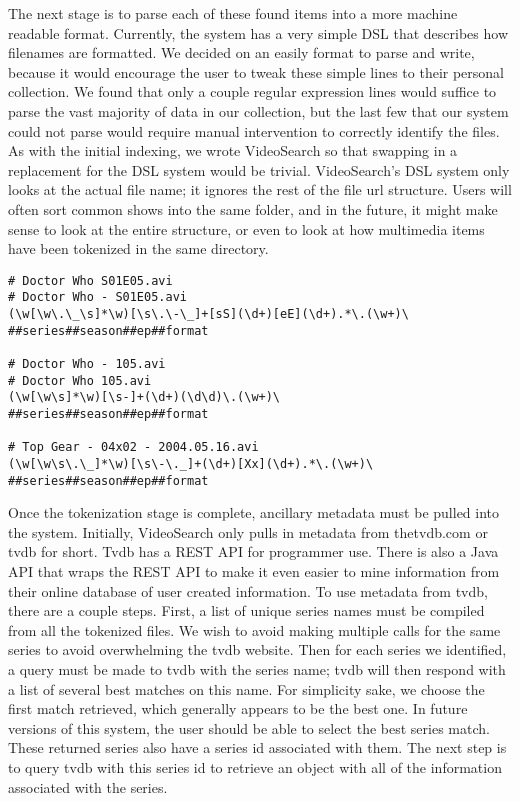\documentclass{acm_proc_article-sp}
\begin{document}
The next stage is to parse each of these found items into a more machine readable format.  Currently, the system has a very simple DSL that describes how filenames are formatted.  We decided on an easily format to parse and write, because it would encourage the user to tweak these simple lines to their personal collection.  \cite{wall2000programming} We found that only a couple regular expression lines would suffice to parse the vast majority of data in our collection, but the last few that our system could not parse would require manual intervention to correctly identify the files.  As with the initial indexing, we wrote VideoSearch so that swapping in a replacement for the DSL system would be trivial.  VideoSearch\textquoteright s DSL system only looks at the actual file name; it ignores the rest of the file url structure.  Users will often sort common shows into the same folder, and in the future, it might make sense to look at the entire structure, or even to look at how multimedia items have been tokenized in the same directory.
\begin{verbatim}
# Doctor Who S01E05.avi
# Doctor Who - S01E05.avi
(\w[\w\.\_\s]*\w)[\s\.\-\_]+[sS](\d+)[eE](\d+).*\.(\w+)\
##series##season##ep##format

# Doctor Who - 105.avi
# Doctor Who 105.avi
(\w[\w\s]*\w)[\s-]+(\d+)(\d\d)\.(\w+)\
##series##season##ep##format

# Top Gear - 04x02 - 2004.05.16.avi
(\w[\w\s\.\_]*\w)[\s\-\._]+(\d+)[Xx](\d+).*\.(\w+)\
##series##season##ep##format
\end{verbatim}
Once the tokenization stage is complete, ancillary metadata must be pulled into the system.  Initially, VideoSearch only pulls in metadata from thetvdb.com or tvdb for short.  Tvdb has a REST API for programmer use. \cite{tvdb} There is also a Java API that wraps the REST API to make it even easier to mine information from their online database of user created information.  To use metadata from tvdb, there are a couple steps.  First, a list of unique series names must be compiled from all the tokenized files.  We wish to avoid making multiple calls for the same series to avoid overwhelming the tvdb website. Then for each series we identified, a query must be made to tvdb with the series name; tvdb will then respond with a list of several best matches on this name.  For simplicity sake, we choose the first match retrieved, which generally appears to be the best one. In future versions of this system, the user should be able to select the best series match.  These returned series also have a series id associated with them.  The next step is to query tvdb with this series id to retrieve an object with all of the information associated with the series.
\end{document}

